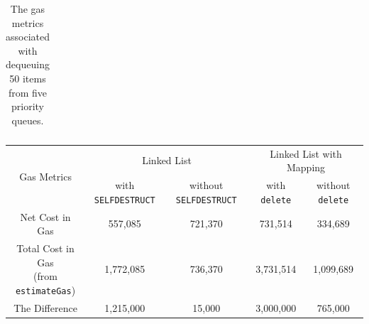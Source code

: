 \begin{table}[]
\begin{tabular}{|c|c|c|c|c|}
\end{tabular}
\caption{\footnotesize{The gas metrics associated with dequeuing 50 items from five priority queues.}
\label{tab:PQUnitTests}}
\end{table}

\begin{table}[]
\begin{tabular}{|c|c|c|c|c|}
\hline
\multirow{2}{*}{Gas Metrics}                        							& \multicolumn{2}{c|}{Linked List}           						& \multicolumn{2}{c|}{Linked List with Mapping}     					\\ \cline{2-5} 
                                                                						& with \texttt{SELFDESTRUCT} 		& without \texttt{SELFDESTRUCT}                	& with \texttt{delete} 		& without \texttt{delete}              		\\ \hline                                                                                                                                                                                                                                                          %
                   Net Cost in Gas                          					& 557,085                    			& 721,370                     				& 731,514                     	& 334,689                      				\\ \hline
\thead{Total Cost in Gas \\ (from \texttt{estimateGas})} 		& 1,772,085                  			& 736,370                  					& 3,731,514                     	& 1,099,689                       				\\ \hline
		    The Difference                                             		& 1,215,000                  			& 15,000                      				& 3,000,000                    	& 765,000                       				\\ \hline


\end{tabular}
\end{table}

